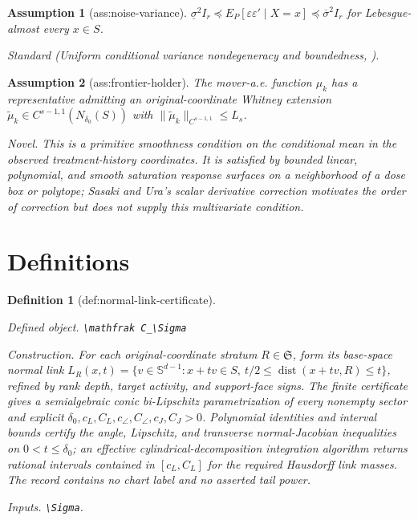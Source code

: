 \documentclass{article}
\newtheorem{assumption}{Assumption}
\newtheorem{definition}{Definition}
\begin{document}
\begin{assumption}[ass:noise-variance]\label{ass:noise-variance}
\(\underline\sigma^2 I_r\preceq E_P[\varepsilon\varepsilon'\mid X=x]\preceq\overline\sigma^2 I_r\) for Lebesgue-almost every \(x\in S\).
\par\smallskip\noindent\emph{Standard} (Uniform conditional variance nondegeneracy and boundedness, \cite{GrahamPowell2012}).
\end{assumption}

\begin{assumption}[ass:frontier-holder]\label{ass:frontier-holder}
The mover-a.e. function \(\mu_k\) has a representative admitting an original-coordinate Whitney extension \(\widetilde\mu_k\in C^{s-1,1}(N_{\delta_0}(S))\) with \(\|\widetilde\mu_k\|_{C^{s-1,1}}\le L_s\).
\par\smallskip\noindent\emph{Novel.} This is a primitive smoothness condition on the conditional mean in the observed treatment-history coordinates. It is satisfied by bounded linear, polynomial, and smooth saturation response surfaces on a neighborhood of a dose box or polytope; Sasaki and Ura's scalar derivative correction motivates the order of correction but does not supply this multivariate condition.
\end{assumption}

\section{Definitions}

\begin{definition}[def:normal-link-certificate]\label{def:normal-link-certificate}
\par\smallskip\noindent\emph{Defined object.} \texttt{\textbackslash{}\allowbreak{}mathfrak C\_\allowbreak{}\textbackslash{}\allowbreak{}Sigma}
\par\smallskip\noindent\emph{Construction.} For each original-coordinate stratum \(R\in\mathfrak S\), form its base-space normal link \(L_R(x,t)=\{v\in\mathbb S^{d-1}:x+tv\in S,\ t/2\le\operatorname{dist}(x+tv,R)\le t\}\), refined by rank depth, target activity, and support-face signs. The finite certificate gives a semialgebraic conic bi-Lipschitz parametrization of every nonempty sector and explicit \(\delta_0,c_L,C_L,c_\angle,C_\angle,c_J,C_J>0\). Polynomial identities and interval bounds certify the angle, Lipschitz, and transverse normal-Jacobian inequalities on \(0<t\le\delta_0\); an effective cylindrical-decomposition integration algorithm returns rational intervals contained in \([c_L,C_L]\) for the required Hausdorff link masses. The record contains no chart label and no asserted tail power.
\par\smallskip\noindent\emph{Inputs.} \texttt{\textbackslash{}\allowbreak{}Sigma}.
\end{definition}
\end{document}
